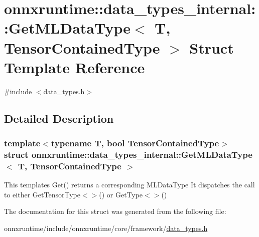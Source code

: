 \hypertarget{structonnxruntime_1_1data__types__internal_1_1GetMLDataType}{}\section{onnxruntime\+:\+:data\+\_\+types\+\_\+internal\+:\+:Get\+M\+L\+Data\+Type$<$ T, Tensor\+Contained\+Type $>$ Struct Template Reference}
\label{structonnxruntime_1_1data__types__internal_1_1GetMLDataType}


{\ttfamily \#include $<$data\+\_\+types.\+h$>$}



\subsection{Detailed Description}
\subsubsection*{template$<$typename T, bool Tensor\+Contained\+Type$>$\newline
struct onnxruntime\+::data\+\_\+types\+\_\+internal\+::\+Get\+M\+L\+Data\+Type$<$ T, Tensor\+Contained\+Type $>$}

This template\textquotesingle{}s Get() returns a corresponding M\+L\+Data\+Type It dispatches the call to either Get\+Tensor\+Type$<$$>$() or Get\+Type$<$$>$() 

The documentation for this struct was generated from the following file\+:\begin{DoxyCompactItemize}
\item 
onnxruntime/include/onnxruntime/core/framework/\mbox{\hyperlink{data__types_8h}{data\+\_\+types.\+h}}\end{DoxyCompactItemize}
